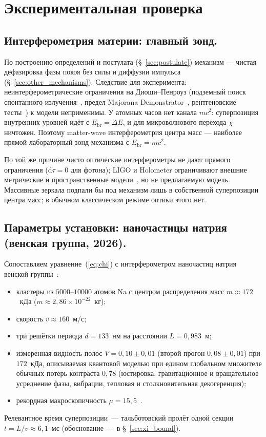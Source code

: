 \documentclass[12pt,a4paper]{article}
\begin{document}
\section{Экспериментальная проверка}
\label{sec:experiment}

\subsection{Интерферометрия материи: главный зонд.}
\label{sec:matter_interferometry}

По построению определений и постулата (\S~\ref{sec:postulate}) механизм --- чистая дефазировка фазы покоя без силы и диффузии импульса (\S~\ref{sec:other_mechanisms}). Следствие для эксперимента: неинтерферометрические ограничения на Диоши--Пенроуз (подземный поиск спонтанного излучения~\cite{donadi2021}, предел Majorana Demonstrator~\cite{majorana2022}, рентгеновские тесты~\cite{piscicchia2024}) к модели неприменимы. У атомных часов нет канала $mc^2$: суперпозиция внутренних уровней идёт с $E_{\mathrm{br}}=\Delta E$, и для микроволнового перехода $\chi$ ничтожен. Поэтому matter-wave интерферометрия центра масс --- наиболее прямой лабораторный зонд механизма с $E_{\mathrm{br}}=mc^2$.

По той же причине чисто оптические интерферометры не дают прямого ограничения ($\mathrm d\tau=0$ для фотона); LIGO и Holometer ограничивают внешние метрические и пространственные модели~\cite{chou2017holometer}, но не предлагаемую модель. Массивные зеркала подпали бы под механизм лишь в собственной суперпозиции центра масс; в обычном классическом режиме оптики этого нет.

\subsection{Параметры установки: наночастицы натрия (венская группа, 2026).}
\label{sec:na_vienna}

Сопоставляем уравнение~(\ref{eq:chi}) с интерферометром наночастиц натрия венской группы~\cite{arndt2025,arndt_arxiv}:
\begin{itemize}
\item кластеры из $5000$--$10000$ атомов Na с центром распределения масс $m\approx 172$~кДа ($m\approx 2{,}86\times10^{-22}$~кг);
\item скорость $v\approx 160$~м/с;
\item три решётки периода $d=133$~нм на расстоянии $L=0{,}983$~м;
\item измеренная видность полос $V=0{,}10\pm0{,}01$ (второй прогон $0{,}08\pm0{,}01$) при $172$~кДа, описываемая квантовой моделью при едином глобальном множителе обычных потерь контраста $0{,}78$ (юстировка, гравитационное и вращательное усреднение фазы, вибрации, тепловая и столкновительная декогеренция);
\item рекордная макроскопичность $\mu=15{,}5$~\cite{macroscopicity,arndt2025}.
\end{itemize}
Релевантное время суперпозиции~--- тальботовский пролёт одной секции $t=L/v\approx 6{,}1$~мс (обоснование~--- в \S~\ref{sec:xi_bound}).
\end{document}
